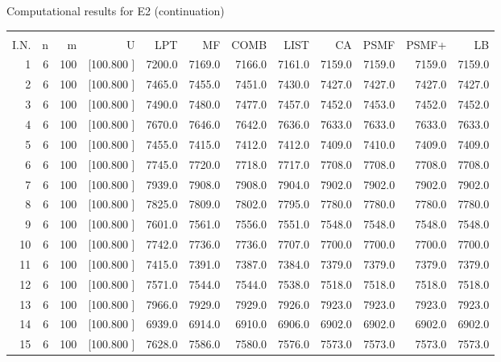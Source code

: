 \documentclass[12pt,a4paper]{article}
\begin{document}
\begin{center}
 Computational results for E2 (continuation) {\tiny
\begin{tabular}{r r r r r r r r r r r r}\hline
    &   &   &          &        &        &        &        &        &        &        &       \\[-0.1in]
  I.N.  &  n  &  m  &  U  &  LPT  &  MF  &  COMB  &  LIST  &  CA  & PSMF &PSMF+ & LB \\[0.03in]
\hline
   1&  6&100&[100.800   ]&  7200.0&  7169.0&  7166.0&  7161.0&  7159.0&  7159.0&  7159.0&  7159.0\\[-0.02in]
   2&  6&100&[100.800   ]&  7465.0&  7455.0&  7451.0&  7430.0&  7427.0&  7427.0&  7427.0&  7427.0\\[-0.02in]
   3&  6&100&[100.800   ]&  7490.0&  7480.0&  7477.0&  7457.0&  7452.0&  7453.0&  7452.0&  7452.0\\[-0.02in]
   4&  6&100&[100.800   ]&  7670.0&  7646.0&  7642.0&  7636.0&  7633.0&  7633.0&  7633.0&  7633.0\\[-0.02in]
   5&  6&100&[100.800   ]&  7455.0&  7415.0&  7412.0&  7412.0&  7409.0&  7410.0&  7409.0&  7409.0\\[-0.02in]
   6&  6&100&[100.800   ]&  7745.0&  7720.0&  7718.0&  7717.0&  7708.0&  7708.0&  7708.0&  7708.0\\[-0.02in]
   7&  6&100&[100.800   ]&  7939.0&  7908.0&  7908.0&  7904.0&  7902.0&  7902.0&  7902.0&  7902.0\\[-0.02in]
   8&  6&100&[100.800   ]&  7825.0&  7809.0&  7802.0&  7795.0&  7780.0&  7780.0&  7780.0&  7780.0\\[-0.02in]
   9&  6&100&[100.800   ]&  7601.0&  7561.0&  7556.0&  7551.0&  7548.0&  7548.0&  7548.0&  7548.0\\[-0.02in]
  10&  6&100&[100.800   ]&  7742.0&  7736.0&  7736.0&  7707.0&  7700.0&  7700.0&  7700.0&  7700.0\\[-0.02in]
  11&  6&100&[100.800   ]&  7415.0&  7391.0&  7387.0&  7384.0&  7379.0&  7379.0&  7379.0&  7379.0\\[-0.02in]
  12&  6&100&[100.800   ]&  7571.0&  7544.0&  7544.0&  7538.0&  7518.0&  7518.0&  7518.0&  7518.0\\[-0.02in]
  13&  6&100&[100.800   ]&  7966.0&  7929.0&  7929.0&  7926.0&  7923.0&  7923.0&  7923.0&  7923.0\\[-0.02in]
  14&  6&100&[100.800   ]&  6939.0&  6914.0&  6910.0&  6906.0&  6902.0&  6902.0&  6902.0&  6902.0\\[-0.02in]
  15&  6&100&[100.800   ]&  7628.0&  7586.0&  7580.0&  7576.0&  7573.0&  7573.0&  7573.0&  7573.0\\[-0.02in]

\end{tabular}}
\end{center}
\end{document}
